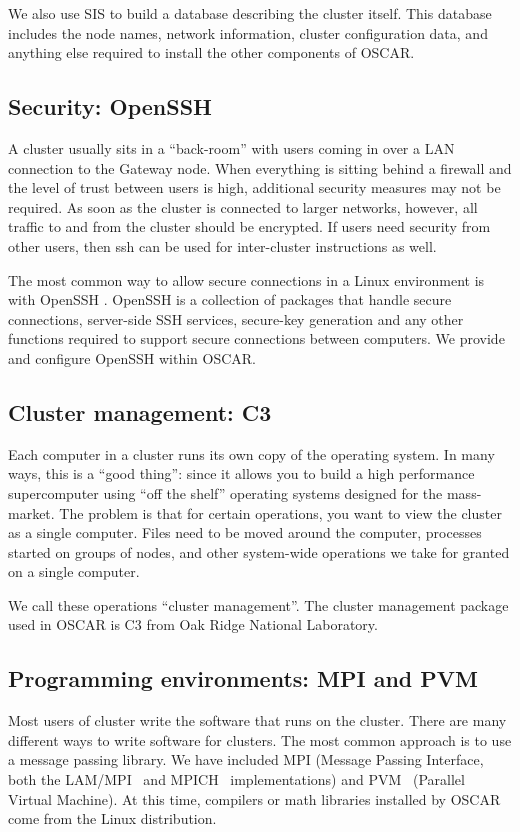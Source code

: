 \documentclass[letterpaper,11pt]{article}
\begin{document}
We also use SIS to build a database describing the cluster itself.
This database includes the node names, network information, cluster
configuration data, and anything else required to install the other
components of OSCAR.


\subsection{Security: OpenSSH}
A cluster usually sits in a ``back-room'' with users coming in over a
LAN connection to the Gateway node.  When everything is sitting behind
a firewall and the level of trust between users is high, additional
security measures may not be required.  As soon as the cluster is
connected to larger networks, however, all traffic to and from the
cluster should be encrypted.  If users need security from other users,
then ssh can be used for inter-cluster instructions as well.

The most common way to allow secure connections in a Linux environment
is with OpenSSH \cite{OpenSSH}.  OpenSSH is a collection of packages
that handle secure connections, server-side SSH services, secure-key
generation and any other functions required to support secure
connections between computers.  We provide and configure OpenSSH 
within OSCAR. 

\subsection{Cluster management: C3}
Each computer in a cluster runs its own copy of the operating system.
In many ways, this is a ``good thing'': since it allows you to build a
high performance supercomputer using ``off the shelf'' operating
systems designed for the mass-market.  The problem is that for certain
operations, you want to view the cluster as a single computer.  Files
need to be moved around the computer, processes started on groups of
nodes, and other system-wide  operations we take for granted on a
single computer.

We call these operations ``cluster management''.  The cluster
management package used in OSCAR is C3 \cite{C3} from Oak Ridge
National Laboratory.


\subsection{Programming environments: MPI and PVM}
Most users of cluster write the software that runs on the cluster.
There are many different ways to write software for clusters.  The
most common approach is to use a message passing library.  We have
included MPI (Message Passing Interface, both the LAM/MPI~\cite{lam}
and MPICH~\cite{mpich} implementations) and PVM~\cite{PVM} (Parallel
Virtual Machine).  At this time, compilers or math libraries installed
by OSCAR come from the Linux distribution.
\end{document}
